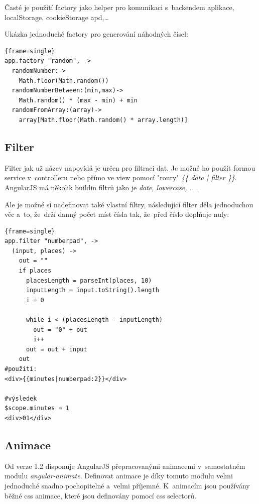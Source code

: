 \documentclass[a4paper,12pt,twoside,BCOR=10mm]{article}
\renewcommand{\it}[1]{\textit{#1}}    %
\newenvironment{codeframe}{%
  \begin{Sbox} 
    \begin{minipage} 
      {\columnwidth-\leftmargin-\rightmargin-2\fboxsep-2\fboxrule-4pt} 
}{%

  \end{minipage} 
  \end{Sbox} 
  \begin{center} 
    \fcolorbox{black}{codeback}{\TheSbox} 
  \end{center} 
}
\begin{document}
Časté je použití factory jako helper pro komunikaci s~backendem aplikace, localStorage, cookieStorage apd,…

Ukázka jednoduché factory pro generování náhodných čísel:
     \begin{codeframe} 
      \begin{Verbatim}{frame=single}
app.factory "random", ->
  randomNumber:->
    Math.floor(Math.random())
  randomNumberBetween:(min,max)->
    Math.random() * (max - min) + min
  randomFromArray:(array)->
    array[Math.floor(Math.random() * array.length)]
\end{Verbatim} 
    \end{codeframe}

\subsection{Filter}
Filter jak už název napovídá je určen pro filtraci dat. Je možné ho použít formou service v~controlleru nebo přímo ve view pomocí "roury" \it{\{\{ data | filter \}\}}. AngularJS má několik buildin filtrů jako je \it{date, lowercase, ...}.

Ale je možné si nadefinovat také vlastní filtry, následující filter děla jednoduchou věc a~to, že~drží danný počet míst čísla tak, že~před číslo doplňuje nuly:
     \begin{codeframe} 
      \begin{Verbatim}{frame=single}
app.filter "numberpad", ->
  (input, places) ->
    out = ""
    if places
      placesLength = parseInt(places, 10)
      inputLength = input.toString().length
      i = 0

      while i < (placesLength - inputLength)
        out = "0" + out
        i++
      out = out + input
    out
#použití:
<div>{{minutes|numberpad:2}}</div>

#výsledek
$scope.minutes = 1
<div>01</div>
\end{Verbatim} 
    \end{codeframe}

\subsection{Animace}
Od verze 1.2 disponuje AngularJS přepracovanými animacemi v~samostatném modulu \it{angular-animate}. Definovat animace je díky tomuto modulu velmi jednoduché snadno pochopitelné a~velmi příjemné. K~animacím jsou používány běžné css animace, které jsou definovány pomocí css selectorů. \cite{angularAnimation}
\end{document}
